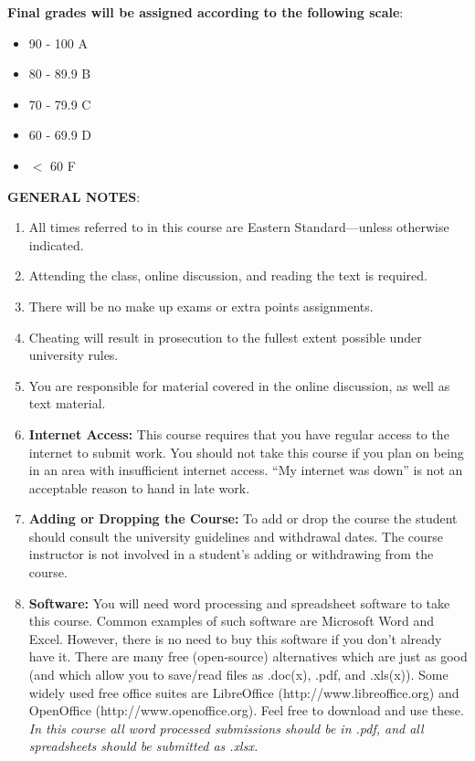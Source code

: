 \documentclass{article}
\begin{document}
\begin{center}
{\bf Final grades will be assigned according to the following scale}:
\end{center}
\begin{itemize}
\item 90 - 100 A
\item 80 - 89.9 B
\item 70 - 79.9 C
\item 60 - 69.9 D
\item $<$ 60 F
\end{itemize}
\begin{center}
{\bf GENERAL NOTES}:
\end{center}
\begin{enumerate}
\item All times referred to in this course are Eastern Standard---unless otherwise indicated.
\item Attending the class, online discussion, and reading the text is required.
\item There will be no make up exams or extra points assignments.
\item Cheating will result in prosecution to the fullest extent possible under university rules.
\item You are responsible for material covered in the online discussion, as well as text material.
\item  {\bf Internet Access:} This course requires that you have regular access to the internet to submit work.  You should not take this course if you plan on being in an area with insufficient internet access. ``My internet was down'' is not an acceptable reason to hand in late work.
\item  {\bf Adding or Dropping the Course:} To add or drop the course the student should consult the university guidelines and withdrawal dates. The course instructor is not involved in a student's adding or withdrawing from the course.
\item {\bf Software:} You will need word processing and spreadsheet software to take
this course. Common examples of such software are Microsoft Word and
Excel. However, there is no need to buy this software if you don't already
have it. There are many free (open-source) alternatives which are just as
good (and which allow you to save/read files as .doc(x), .pdf, and .xls(x)).
Some widely used free office suites are LibreOffice (http://www.libreoffice.org)
and OpenOffice (http://www.openoffice.org). Feel free to download and use
these. {\it In this course all word processed submissions should be in .pdf, and
all spreadsheets should be submitted as .xlsx.}
\end{enumerate}
\end{document}
